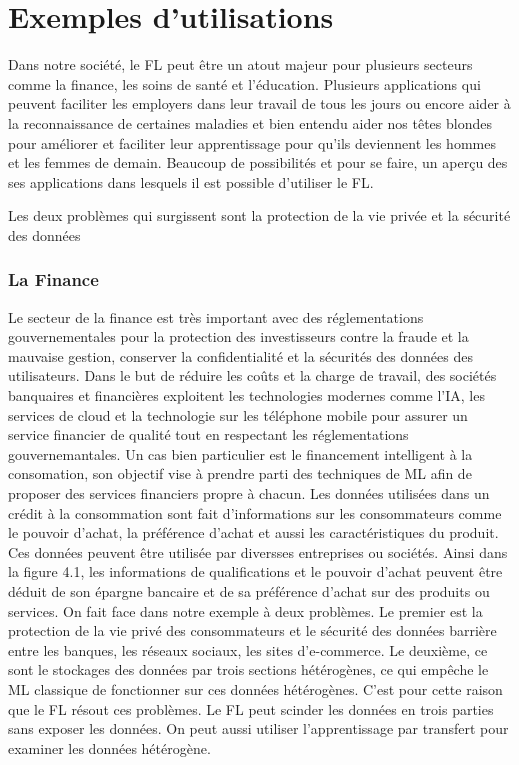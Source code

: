 \documentclass[12pt,a4paper]{report}
\begin{document}
\chapter{Exemples d'utilisations}

Dans notre société, le FL peut être un atout majeur pour plusieurs secteurs comme la finance, les soins de santé et l'éducation. Plusieurs applications qui peuvent faciliter les employers dans leur travail de tous les jours ou encore aider à la reconnaissance de certaines maladies et bien entendu aider nos têtes blondes pour améliorer et faciliter leur apprentissage pour qu'ils deviennent les hommes et les femmes de demain. Beaucoup de possibilités et pour se faire, un aperçu des ses applications dans lesquels il est possible d'utiliser le FL. 


Les deux problèmes qui surgissent sont la protection de la vie privée et la sécurité des données

\subsection{La Finance}

Le secteur de la finance est très important avec des réglementations gouvernementales pour la protection des investisseurs contre la fraude et la mauvaise gestion, conserver la confidentialité et la sécurités des données des utilisateurs. Dans le but de réduire les coûts et la charge de travail, des sociétés banquaires et financières exploitent les technologies modernes comme l'IA, les services de cloud et la technologie sur les téléphone mobile pour assurer un service financier de qualité tout en respectant les réglementations gouvernemantales. Un cas bien particulier est le financement intelligent à la consomation, son objectif vise à prendre parti des techniques de ML afin de proposer des services financiers propre à chacun. Les données utilisées dans un crédit à la consommation sont fait d'informations sur les consommateurs comme le pouvoir d'achat, la préférence d'achat et aussi les caractéristiques du produit. Ces données peuvent être utilisée par diversses entreprises ou sociétés. Ainsi dans la figure 4.1, les informations de qualifications et le pouvoir d'achat peuvent être déduit de son épargne bancaire et de sa préférence d'achat sur des produits ou services. On fait face dans notre exemple à deux problèmes. Le premier est la protection de la vie privé des consommateurs et le sécurité des données barrière entre les banques, les réseaux sociaux, les sites d'e-commerce. Le deuxième, ce sont le stockages des données par trois sections hétérogènes, ce qui empêche le ML classique de fonctionner sur ces données hétérogènes. C'est pour cette raison que le FL résout ces problèmes. Le FL peut scinder les données en trois parties sans exposer les données. On peut aussi utiliser l'apprentissage par transfert pour examiner les données hétérogène.
\end{document}
